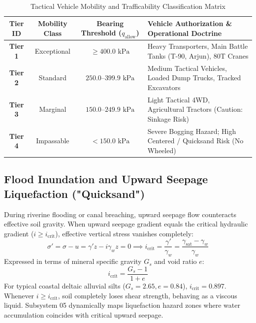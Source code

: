 \documentclass[11pt,a4paper]{article}
\theoremstyle{definition}
\theoremstyle{remark}
\begin{document}
\begin{table}[htbp]
\centering
\small
\caption{Tactical Vehicle Mobility and Trafficability Classification Matrix}
\begin{tabular}{cccl}
\toprule
\textbf{Tier ID} & \textbf{Mobility Class} & \textbf{Bearing Threshold ($q_{\text{allow}}$)} & \textbf{Vehicle Authorization \& Operational Doctrine} \\
\midrule
\textbf{Tier 1} & Exceptional & $\ge 400.0\text{ kPa}$ & Heavy Transporters, Main Battle Tanks (T-90, Arjun), 80T Cranes \\
\textbf{Tier 2} & Standard & $250.0 \text{--} 399.9\text{ kPa}$ & Medium Tactical Vehicles, Loaded Dump Trucks, Tracked Excavators \\
\textbf{Tier 3} & Marginal & $150.0 \text{--} 249.9\text{ kPa}$ & Light Tactical 4WD, Agricultural Tractors (Caution: Sinkage Risk) \\
\textbf{Tier 4} & Impassable & $< 150.0\text{ kPa}$ & Severe Bogging Hazard; High Centered / Quicksand Risk (No Wheeled) \\
\bottomrule
\end{tabular}
\label{tab:mobility_matrix_sec5}
\end{table}

\subsection{Flood Inundation and Upward Seepage Liquefaction ("Quicksand")}
During riverine flooding or canal breaching, upward seepage flow counteracts effective soil gravity. When upward seepage gradient equals the critical hydraulic gradient ($i \ge i_{\text{crit}}$), effective vertical stress vanishes completely:
\begin{equation}
    \sigma' = \sigma - u = \gamma' z - i \gamma_w z = 0 \implies i_{\text{crit}} = \frac{\gamma'}{\gamma_w} = \frac{\gamma_{\text{sat}} - \gamma_w}{\gamma_w}
    \label{eq:quicksand_derivation}
\end{equation}
Expressed in terms of mineral specific gravity $G_s$ and void ratio $e$:
\begin{equation}
    i_{\text{crit}} = \frac{G_s - 1}{1 + e}
\end{equation}
For typical coastal deltaic alluvial silts ($G_s = 2.65, e = 0.84$), $i_{\text{crit}} = 0.897$. Whenever $i \ge i_{\text{crit}}$, soil completely loses shear strength, behaving as a viscous liquid. Subsystem 05 dynamically maps liquefaction hazard zones where water accumulation coincides with critical upward seepage.
\end{document}
